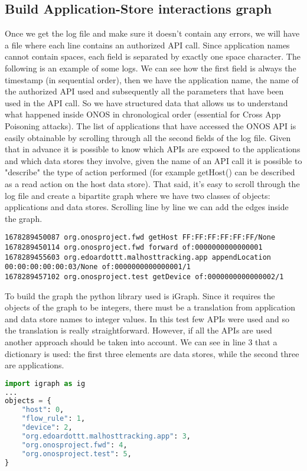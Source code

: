 \documentclass[a4paper,10pt]{memoir}
\begin{document}
\subsection{Build Application-Store interactions graph}
Once we get the log file and make sure it doesn't contain any errors, we will have a file where each line contains an authorized API call. Since application names cannot contain spaces, each field is separated by exactly one space character. The following is an example of some logs. We can see how the first field is always the timestamp (in sequential order), then we have the application name, the name of the authorized API used and subsequently all the parameters that have been used in the API call. So we have structured data that allows us to understand what happened inside ONOS in chronological order (essential for Cross App Poisoning attacks). The list of applications that have accessed the ONOS API is easily obtainable by scrolling through all the second fields of the log file. Given that in advance it is possible to know which APIs are exposed to the applications and which data stores they involve, given the name of an API call it is possible to "describe" the type of action performed (for example getHost() can be described as a read action on the host data store). That said, it's easy to scroll through the log file and create a bipartite graph where we have two classes of objects: applications and data stores. Scrolling line by line we can add the edges inside the graph.
\begin{lstlisting}
1678289450087 org.onosproject.fwd getHost FF:FF:FF:FF:FF:FF/None
1678289450114 org.onosproject.fwd forward of:0000000000000001
1678289455603 org.edoardottt.malhosttracking.app appendLocation 00:00:00:00:00:03/None of:0000000000000001/1
1678289457102 org.onosproject.test getDevice of:0000000000000002/1
\end{lstlisting}

To build the graph the python library used is iGraph. Since it requires the objects of the graph to be integers, there must be a translation from application and data store names to integer values. In this test few APIs were used and so the translation is really straightforward. However, if all the APIs are used another approach should be taken into account. We can see in line 3 that a dictionary is used: the first three elements are data stores, while the second three are applications.
\begin{lstlisting}[language=python,firstnumber=1]
import igraph as ig
...
objects = {
    "host": 0,
    "flow_rule": 1,
    "device": 2,
    "org.edoardottt.malhosttracking.app": 3,
    "org.onosproject.fwd": 4,
    "org.onosproject.test": 5,
}
\end{lstlisting}
\end{document}
